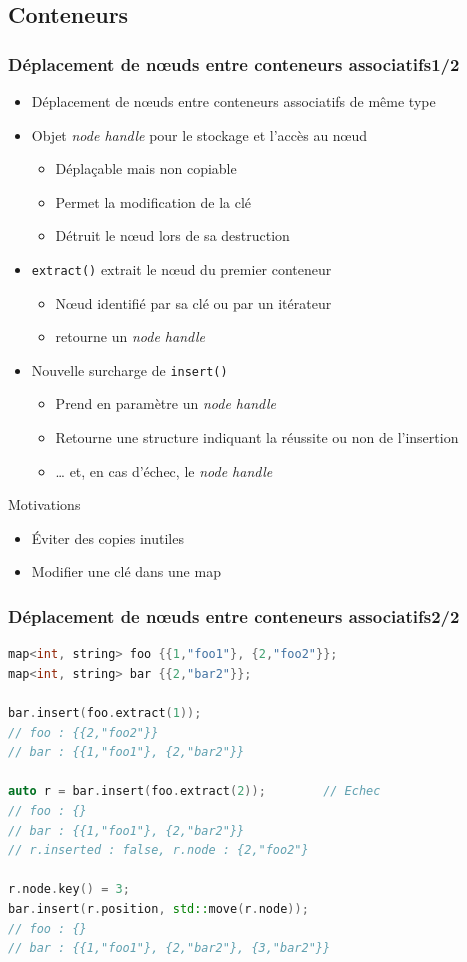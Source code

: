 \documentclass[C++.tex]{subfiles}
\begin{document}
\subsection*{Conteneurs}
\begin{frame}[fragile]
	\frametitle{Déplacement de nœuds entre conteneurs associatifs\titlehfill{}1/2}
	\begin{itemize}
		\item Déplacement de nœuds entre conteneurs associatifs de même type
		\item Objet \textit{node handle} pour le stockage et l'accès au nœud
		\begin{itemize}
			\item Déplaçable mais non copiable
			\item Permet la modification de la clé
			\item Détruit le nœud lors de sa destruction
		\end{itemize}
		\item \lstinline|extract()| extrait le nœud du premier conteneur
		\begin{itemize}
			\item Nœud identifié par sa clé ou par un itérateur
			\item retourne un \textit{node handle}
		\end{itemize}
		\item Nouvelle surcharge de \lstinline|insert()|
		\begin{itemize}
			\item Prend en paramètre un \textit{node handle}
			\item Retourne une structure indiquant la réussite ou non de l'insertion
			\item \ldots{} et, en cas d'échec, le \textit{node handle}
		\end{itemize}
	\end{itemize}

	\begin{block}{Motivations}
		\begin{itemize}
			\item Éviter des copies inutiles
			\item Modifier une clé dans une map
		\end{itemize}
	\end{block}
\end{frame}

\begin{frame}[fragile]
	\frametitle{Déplacement de nœuds entre conteneurs associatifs\titlehfill{}2/2}
	\begin{lstlisting}[language=C++]
map<int, string> foo {{1,"foo1"}, {2,"foo2"}};
map<int, string> bar {{2,"bar2"}};

bar.insert(foo.extract(1));
// foo : {{2,"foo2"}}
// bar : {{1,"foo1"}, {2,"bar2"}}

auto r = bar.insert(foo.extract(2));		// Echec
// foo : {}
// bar : {{1,"foo1"}, {2,"bar2"}}
// r.inserted : false, r.node : {2,"foo2"}

r.node.key() = 3;
bar.insert(r.position, std::move(r.node));
// foo : {}
// bar : {{1,"foo1"}, {2,"bar2"}, {3,"bar2"}}\end{lstlisting}
\end{frame}
\end{document}
